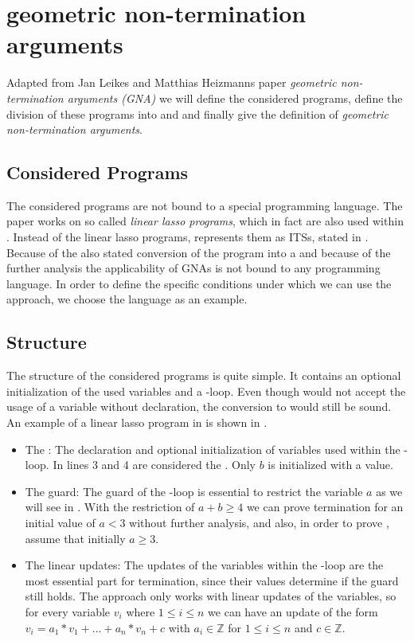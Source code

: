 \section{geometric non-termination arguments}
Adapted from Jan Leikes and Matthias Heizmanns paper \textit{geometric non-termination arguments (GNA)} \cite{leike2014geometric} we will define the considered programs, define the division of these programs into \stem and \loopt and finally give the definition of \textit{geometric non-termination arguments}.

\subsection{Considered Programs}
The considered programs are not bound to a special programming language. The paper works on so called \textit{linear lasso programs}, which in fact are also used within \aprove. Instead of the linear lasso programs, \aprove represents them as ITSs, stated in . Because of the also stated conversion of the program into a \seg and because of the further analysis the applicability of GNAs is not bound to any programming language. \newline
In order to define the specific conditions under which we can use the approach, we choose the language  as an example.
\subsection{Structure}
\label{sec:structure}
The structure of the considered programs is quite simple. It contains an optional initialization  of the used variables and a -loop. Even though  would not accept the usage of a variable without declaration, the conversion to \llvm would still be sound. An example of a linear lasso program in  is shown in . 
\begin{itemize}
	\item The \stem: \newline
		The declaration and optional initialization of variables used within the -loop. In  lines 3 and 4 are considered the \stem. Only $b$ is initialized with a value.
	\item The guard: \newline
		The guard of the -loop is essential to restrict the variable $a$ as we will see in . With the restriction of $a+b\ge 4 $ we can prove termination for an initial value of $a < 3$ without further analysis, and also, in order to prove \nonterm, assume that initially $a \ge 3$.
	\item The linear updates: \newline
		The updates of the variables within the -loop are the most essential part for termination, since their values determine if the guard still holds. The approach only works with linear updates of the variables, so for every variable $v_i$ where $1\le i\le n$ we can have an update of the form $v_i=a_1*v_1+...+a_n*v_n+c$ with $a_i \in \mathbb{Z}$ for $1 \le i \le n$ and $c \in \mathbb{Z}$.
\end{itemize} 

